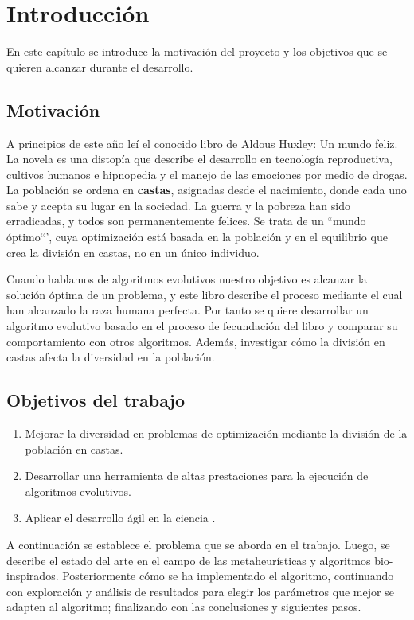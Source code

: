 \chapter{Introducción}

En este capítulo se introduce la motivación del proyecto y los objetivos que se quieren alcanzar durante el desarrollo. 

\section{Motivación}

A principios de este año leí el conocido libro de Aldous Huxley: Un mundo feliz. La novela es una
distopía que describe el desarrollo en tecnología reproductiva, cultivos humanos e hipnopedia y el manejo de las
emociones por medio de drogas. La población se ordena en \textbf{castas}, asignadas desde el nacimiento, donde cada uno
sabe y acepta su lugar en la sociedad. La guerra y la pobreza han sido erradicadas, y todos son permanentemente
felices. Se trata de un ``mundo óptimo``', cuya optimización está basada en la población y en el equilibrio que crea
la división en castas, no en un único individuo. 

Cuando hablamos de algoritmos evolutivos nuestro objetivo es alcanzar la solución óptima de un problema, y este libro describe el 
proceso mediante el cual han alcanzado la raza humana perfecta. Por tanto se quiere desarrollar un algoritmo evolutivo basado en 
el proceso de fecundación del libro y comparar su comportamiento con otros algoritmos. Además, investigar cómo la división en castas afecta 
la diversidad en la población.

\section{Objetivos del trabajo}

\begin{enumerate}
    \item Mejorar la diversidad en problemas de optimización mediante la división de la población en castas.
    \item Desarrollar una herramienta de altas prestaciones para la ejecución de algoritmos evolutivos.
    \item Aplicar el desarrollo ágil en la ciencia \cite{DBLP}.
\end{enumerate}


A continuación se establece el problema que se aborda en el trabajo. Luego, se describe el estado del arte en el campo 
de las metaheurísticas y algoritmos bio-inspirados. Posteriormente cómo se ha implementado el algoritmo, continuando con exploración
y análisis de resultados para elegir los parámetros que mejor se adapten al algoritmo; finalizando con las conclusiones y siguientes pasos.   
